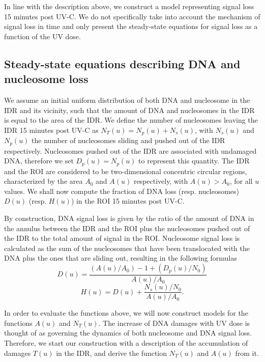 \documentclass[12pt]{article}
\begin{document}
In line with the description above, we construct a model representing signal loss 15 minutes post UV-C. We do not specifically take into account the mechanism of signal loss in time and only present the steady-state equations for signal loss as a function of the UV dose.

\subsection{Steady-state equations describing DNA and nucleosome loss }\label{subsection:fractionOfDNAandNucleosomeLoss}
We assume an initial uniform distribution of both DNA and nucleosome in the IDR and its vicinity, such that the amount of DNA and nucleosomes in the IDR is equal to the area of the IDR. 
We define the number of nucleosomes leaving the IDR 15 minutes post UV-C as $N_T(u)=N_p(u)+N_s(u)$, with $N_s(u)$ and $N_p(u)$ the number of nucleosomes sliding and pushed out of the IDR respectively. Nucleosomes pushed out of the IDR are associated with undamaged DNA, therefore we set $D_p(u)=N_p(u)$ to represent this quantity. The IDR and the ROI are considered to be two-dimensional concentric circular regions, characterized by the area $A_0$ and $A(u)$ respectively, with $A(u)>A_0$, for all $u$ values. We shall now compute the fraction of DNA loss (resp. nucleosomes) $D(u)$ (resp. $H(u)$) in the ROI 15 minutes post UV-C. 

By construction, DNA signal loss is given by the ratio of the amount of DNA in the annulus between the IDR and the ROI plus the nucleosomes pushed out of the IDR to the total amount of signal in the ROI. Nucleosome signal loss is calculated as the sum of the nucleosomes that have been translocated with the DNA plus the ones that are sliding out, resulting in the following formulas
\begin{equation}\label{eq:DNAStSt}
D(u)= \frac{(A(u)/A_0)-1 +(D_p(u)/N_0)}{A(u)/A_0}
\end{equation}
\begin{equation}
\label{eq:histoneStSt}
H(u)=D(u)+\frac{N_s(u)/N_0}{A(u)/A_0}.
\end{equation}

In order to evaluate the functions above, we will now construct models for the functions $A(u)$ and $N_T(u)$. The increase of DNA damages with UV dose is thought of as governing the dynamics of both nucleosome and DNA signal loss. Therefore, we start our construction with a description of the accumulation of damages $T(u)$ in the IDR, and derive the function $N_T(u)$ and $A(u)$ from it.
\end{document}
